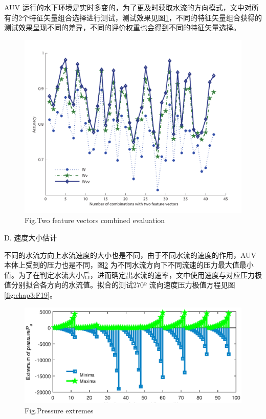 AUV 运行的水下环境是实时多变的，为了更及时获取水流的方向模式，文中对所有的2个特征矢量组合选择进行测试，测试效果见图\ref{fig:chap3:F17}，不同的特征矢量组合获得的测试效果呈现不同的差异，不同的评价权重也会得到不同的特征矢量选择。

\begin{figure}[!htp]
    \centering
        \includegraphics[width=14cm]{figure/chap3/fig8_Total_LDA_two_eigvalue_accurry_EnglishVersion1.pdf}
        \label{fig:chap3:F17}
         {Fig.}{Two feature vectors combined evaluation }
\end{figure}

D. {速度大小估计 }

不同的水流方向上水流速度的大小也是不同，由于不同水流的速度的作用，AUV 本体上受到的压力也是不同，图\ref{fig:chap3:F18} 为不同水流方向下不同流速的压力最大值最小值。为了在判定水流大小后，进而确定出水流的速率，文中使用速度与对应压力极值分别拟合各方向的水流值。拟合的测试270º 流向速度压力极值方程见图\ref{fig:chap3:F19}。

\begin{figure}[!htp]
    \centering
        {
        \includegraphics[width=14cm]{figure/chap3/fig9_press_value_maxmin_EnglishVersion1.eps}
        }
        \label{fig:chap3:F18}
         {Fig.}{Pressure extremes }
\end{figure}

